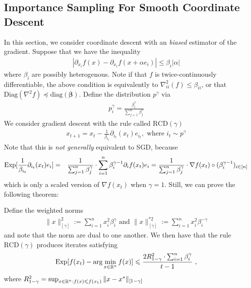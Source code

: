 	\subsection{Importance Sampling For Smooth Coordinate Descent}
	In this section, we consider coordinate descent with an \emph{biased} estimator of the gradient. Suppose that we have the inequality
	\begin{eqnarray}
	|\partial_{x_i} f(x) - \partial_{x_i} f(x + \alpha e_i)| \le \beta_{i}|\alpha|
	\end{eqnarray}
	where $\beta_i$ are possibly heterogenous. Note if that $f$ is twice-continuously differentiable, the above condition is equivalently to $\nabla^2_{ii}(f) \le \beta_{ii}$, or that $\mathrm{Diag}(\nabla^2 f) \preceq \mathrm{diag}(\boldsymbol{\beta})$.  Define the distribution $p^\gamma$ via
	\begin{eqnarray}
	p^{\gamma}_i = \frac{\beta_i^{\gamma}}{\sum_{j=1}^n \beta_j^{\gamma}}
	\end{eqnarray}
	We consider gradient descent with the rule called $\mathrm{RCD}(\gamma)$
	\begin{eqnarray}\label{RCDgamma}
	x_{t+1} = x_t - \frac{1}{\beta_{i_t}}\partial_{i_t}(x_t)e_{i_t}, \text{ where } i_t \sim p^{\gamma}
	\end{eqnarray}
	Note that this is \emph{not generally} equivalent to SGD, because 
	\begin{eqnarray}
	\mathrm{Exp}[\frac{1}{\beta_{i_t}}\partial_{i_t}(x_t)e_i] &=& \frac{1}{\sum_{j=1}^n \beta_j^{\gamma}} \cdot \sum_{i=1}^n \beta_{i}^{\gamma - 1} \partial_i f(x_t)e_i = \frac{1}{\sum_{j=1}^n \beta_j^{\gamma}} \cdot \nabla f(x_t) \circ (\beta_i^{\gamma - 1})_{i \in [n]}
	\end{eqnarray}
	which is only a scaled version of $\nabla f(x_t)$ when $\gamma = 1$. Still, we can prove the following theorem:
	\begin{theorem} Define the weighted norms
	\begin{eqnarray}
	\|x\|_{[\gamma]}^2 := \sum_{i=1}^n x_i^2 \beta_i^\gamma \text{ and } \|x\|_{[\gamma]}^{*2} := \sum_{i=1}^n x_i^2 \beta_i^{-\gamma}
	\end{eqnarray}
	and note that the norm are dual to one another. We then have that  the rule $\mathrm{RCD}(\gamma)$ produces iterates satisfying
	\begin{eqnarray}
	\mathrm{Exp}[f(x_t) - \arg\min_{x \in \mathbb{R}^{n}} f(x)] \leqslant \frac{2 R^2_{1-\gamma} \cdot \sum_{i=1}^n \beta_{i}^{\gamma}}{t-1}~,
	\end{eqnarray}
	where $R^2_{1-\gamma} = \sup_{x \in \mathbb{R}^n:f(x) \leqslant f(x_1)} \|x - x^*\|_{[1 - \gamma]} $
	\end{theorem}
